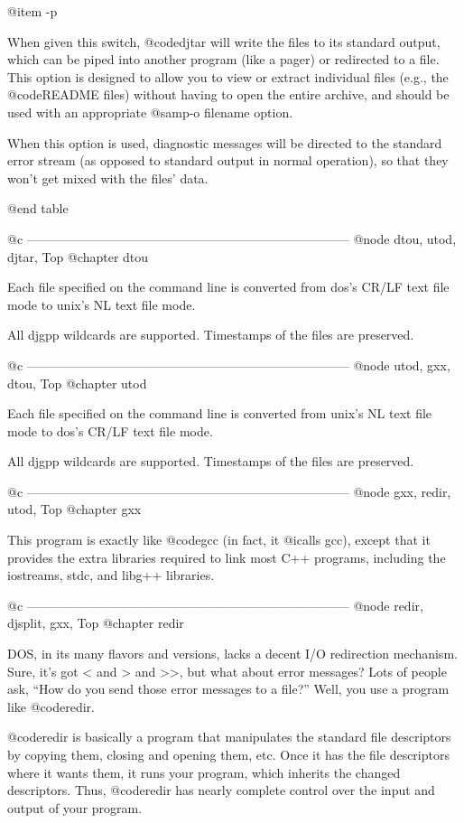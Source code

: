 @item -p

When given this switch, @code{djtar} will write the files to its standard
output, which can be piped into another program (like a pager) or
redirected to a file.  This option is designed to allow you to view or
extract individual files (e.g., the @code{README} files) without having to
open the entire archive, and should be used with an appropriate @samp{-o
filename} option.

When this option is used, diagnostic messages will be directed to the
standard error stream (as opposed to standard output in normal operation),
so that they won't get mixed with the files' data.

@end table

@c -----------------------------------------------------------------------------
@node dtou, utod, djtar, Top
@chapter dtou

Each file specified on the command line is converted from dos's CR/LF
text file mode to unix's NL text file mode.

All djgpp wildcards are supported.  Timestamps of the files are preserved.

@c -----------------------------------------------------------------------------
@node utod, gxx, dtou, Top
@chapter utod

Each file specified on the command line is converted from unix's NL text
file mode to dos's CR/LF text file mode.

All djgpp wildcards are supported.  Timestamps of the files are preserved.

@c -----------------------------------------------------------------------------
@node gxx, redir, utod, Top
@chapter gxx

This program is exactly like @code{gcc} (in fact, it @i{calls} gcc), except
that it provides the extra libraries required to link most C++ programs,
including the iostreams, stdc, and libg++ libraries.

@c -----------------------------------------------------------------------------
@node    redir, djsplit, gxx, Top
@chapter redir

DOS, in its many flavors and versions, lacks a decent I/O redirection
mechanism.  Sure, it's got < and > and >>, but what about error
messages?  Lots of people ask, ``How do you send those error messages
to a file?''  Well, you use a program like @code{redir}.

@code{redir} is basically a program that manipulates the standard file
descriptors by copying them, closing and opening them, etc.  Once it
has the file descriptors where it wants them, it runs your program,
which inherits the changed descriptors.  Thus, @code{redir} has nearly
complete control over the input and output of your program.

